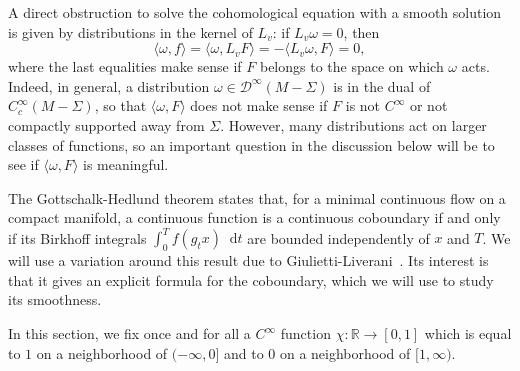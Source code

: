 \documentclass[11pt, a4paper, oneside, final, pagebackref]{amsart}
\newcommand{\boD}{\mathcal{D}}
\newcommand{\R}{\mathbb{R}}
\newcommand{\dd}{\mathop{}\!\mathrm{d}}
\theoremstyle{definition}
\numberwithin{equation}{section}
\begin{document}
A direct obstruction to solve the cohomological equation with a smooth
solution is given by distributions in the kernel of $L_v$: if $L_v \omega =
0$, then
\begin{equation*}
  \langle \omega, f \rangle = \langle \omega, L_v F \rangle
  =- \langle L_v \omega, F \rangle = 0,
\end{equation*}
where the last equalities make sense if $F$ belongs to the space on which
$\omega$ acts. Indeed, in general, a distribution $\omega \in
\boD^\infty(M-\Sigma)$ is in the dual of $C^\infty_c(M-\Sigma)$, so that
$\langle \omega, F\rangle$ does not make sense if $F$ is not $C^\infty$ or
not compactly supported away from $\Sigma$. However, many distributions act
on larger classes of functions, so an important question in the discussion
below will be to see if $\langle \omega, F\rangle$ is meaningful.

The Gottschalk-Hedlund theorem states that, for a minimal continuous flow on
a compact manifold, a continuous function is a continuous coboundary if and
only if its Birkhoff integrals $\int_0^T f(g_t x) \dd t$ are bounded
independently of $x$ and $T$. We will use a variation around this result due
to Giulietti-Liverani~\cite{giulietti_liverani}. Its interest is that it
gives an explicit formula for the coboundary, which we will use to study its
smoothness.

In this section, we fix once and for all a $C^\infty$ function $\chi:\R \to
[0,1]$ which is equal to $1$ on a neighborhood of $(-\infty, 0]$ and to $0$
on a neighborhood of $[1,\infty)$.
\end{document}
